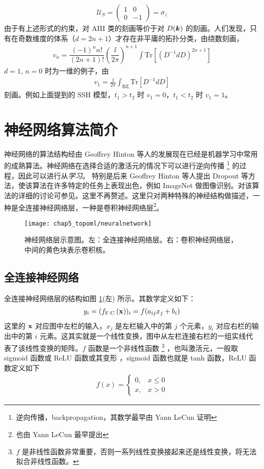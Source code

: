 \begin{align}
\mathcal{U}_S = \begin{pmatrix}
1 & 0 \\
0 & -1 
\end{pmatrix} 
= \sigma_z
\end{align}
由于有上述形式的约束，对 AIII 类的刻画等价于对 $D(\boldsymbol{k})$ 的刻画。人们发现，只有在奇数维度的体系（$d=2n+1$）才存在非平庸的拓扑分类，由绕数刻画，
\begin{align}
v_n = \dfrac{(-1)^nn!}{(2n+1)!}\left(\dfrac{\ii}{2\pi}\right)^{n+1}
\int\text{Tr}[(D^{-1}dD)^{2n+1}]
\end{align}
$d=1$, $n=0$ 时为一维的例子，由
\begin{align}
v_1 = \frac{\ii}{2\pi}\int_{\text{BZ}}\text{Tr}[D^{-1}dD]
\end{align}
刻画。例如上面提到的 SSH 模型，$t_1>t_2$ 时 $v_1=0$，$t_1<t_2$ 时 $v_1=1$。



\section{神经网络算法简介} \label{sec:neuralnetwork}
神经网络的算法结构经由 Geoffrey Hinton 等人的发展现在已经是机器学习中常用的成熟算法。神经网络在选择合适的激活元的情况下可以进行逆向传播
\footnote{逆向传播，backpropagation，其数学最早由 Yann LeCun 证明}
的过程，因此可以进行从\textit{学习}。
特别是后来 Geoffrey Hinton 等人提出 Dropout 等方法，使该算法在许多特定的任务上表现出色，例如 ImageNet 做图像识别\cite{imagenet2012}。对该算法的详细的讨论可参见\cite{prmlbook}。这里不再赘述。这里只对两种特殊的神经结构做描述，一种是全连接神经网络层，一种是卷积神经网络层\footnote{也由 Yann LeCun 最早提出}。

\begin{figure}[t]
\centering
\texttt{[image: chap5\_topoml/neuralnetwork]}
\caption{神经网络层示意图。左：全连接神经网络层。右：卷积神经网络层，中间的黄色块表示卷积核。}
\label{fig:nn}
\end{figure}


\subsection{全连接神经网络}
全连接神经网络层的结构如图 \ref{fig:nn}(左) 所示。其数学定义如下：
\begin{align}
y_i = (f_{\text{F.C.}}(\mathbf{x}))_i = f(a_{ij}x_j + b_i)
\end{align}
这里的 $\mathbf{x}$ 对应图中左栏的输入，$x_j$ 是左栏输入中的第 $j$ 个元素，$y_i$ 对应右栏的输出中的第 $i$ 元素。这其实就是一个线性变换，图中从左栏连接右栏的一组实线代表了该线性变换的矩阵。$f$ 函数是一个非线性函数
\footnote{$f$ 是非线性函数非常重要，否则一系列线性变换接起来还是线性变换，将无法拟合非线性函数。}
，也叫激活元，一般取 sigmoid 函数或 ReLU 函数或其变形 \cite{prmlbook,topoml} ，sigmoid 函数也就是 tanh 函数，ReLU 函数定义如下
\begin{align}
f(x) = \begin{cases}
0, & x\leq0 \\
x, & x>0
\end{cases}
\end{align}

